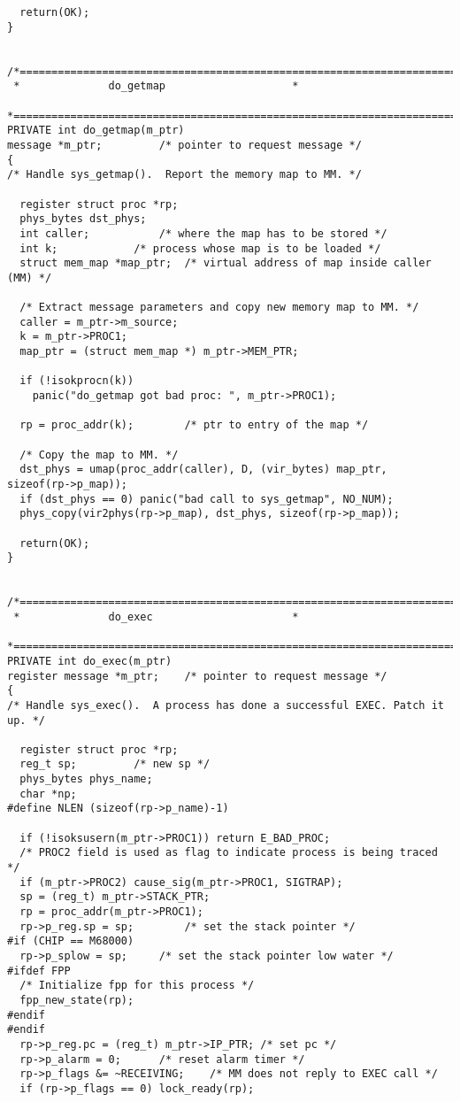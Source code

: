 \begin{verbatim}
  return(OK);
}


/*===========================================================================*
 *				do_getmap				     *
 *===========================================================================*/
PRIVATE int do_getmap(m_ptr)
message *m_ptr;			/* pointer to request message */
{
/* Handle sys_getmap().  Report the memory map to MM. */

  register struct proc *rp;
  phys_bytes dst_phys;
  int caller;			/* where the map has to be stored */
  int k;			/* process whose map is to be loaded */
  struct mem_map *map_ptr;	/* virtual address of map inside caller (MM) */

  /* Extract message parameters and copy new memory map to MM. */
  caller = m_ptr->m_source;
  k = m_ptr->PROC1;
  map_ptr = (struct mem_map *) m_ptr->MEM_PTR;

  if (!isokprocn(k))
	panic("do_getmap got bad proc: ", m_ptr->PROC1);

  rp = proc_addr(k);		/* ptr to entry of the map */

  /* Copy the map to MM. */
  dst_phys = umap(proc_addr(caller), D, (vir_bytes) map_ptr, sizeof(rp->p_map));
  if (dst_phys == 0) panic("bad call to sys_getmap", NO_NUM);
  phys_copy(vir2phys(rp->p_map), dst_phys, sizeof(rp->p_map));

  return(OK);
}


/*===========================================================================*
 *				do_exec					     *
 *===========================================================================*/
PRIVATE int do_exec(m_ptr)
register message *m_ptr;	/* pointer to request message */
{
/* Handle sys_exec().  A process has done a successful EXEC. Patch it up. */

  register struct proc *rp;
  reg_t sp;			/* new sp */
  phys_bytes phys_name;
  char *np;
#define NLEN (sizeof(rp->p_name)-1)

  if (!isoksusern(m_ptr->PROC1)) return E_BAD_PROC;
  /* PROC2 field is used as flag to indicate process is being traced */
  if (m_ptr->PROC2) cause_sig(m_ptr->PROC1, SIGTRAP);
  sp = (reg_t) m_ptr->STACK_PTR;
  rp = proc_addr(m_ptr->PROC1);
  rp->p_reg.sp = sp;		/* set the stack pointer */
#if (CHIP == M68000)
  rp->p_splow = sp;		/* set the stack pointer low water */
#ifdef FPP
  /* Initialize fpp for this process */
  fpp_new_state(rp);
#endif
#endif
  rp->p_reg.pc = (reg_t) m_ptr->IP_PTR;	/* set pc */
  rp->p_alarm = 0;		/* reset alarm timer */
  rp->p_flags &= ~RECEIVING;	/* MM does not reply to EXEC call */
  if (rp->p_flags == 0) lock_ready(rp);


\end{verbatim}
